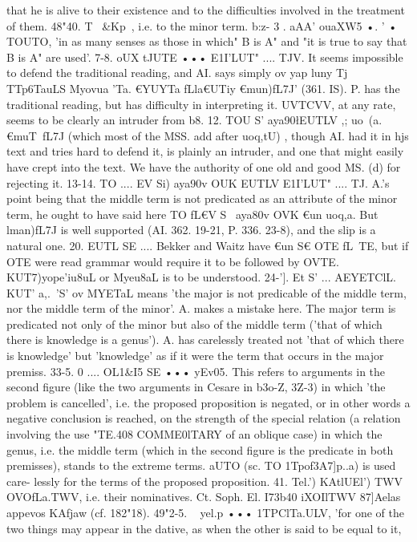{{{{{{{{{{{{{{{{{{{{{{{{{{that he is alive to their existence and to the difficulties involved
in the treatment of them.
48"40. T~ &Kp~, i.e. to the minor term.
b:z- 3 . aAA' ouaXW5 •. ' • TOUTO, 'in as many senses as those in
which" B is A" and "it is true to say that B is A" are used'.
7-8. oUX tJUTE ••• E1I'LUT" .... TJV. It seems impossible to defend
the traditional reading, and AI. says simply ov yap luny Tj
TTp6TauLS Myovua 'Ta. €YUYT{a fLla€UTiy €mun)fL7J' (361. IS). P. has
the traditional reading, but has difficulty in interpreting it.
UVTCVV, at any rate, seems to be clearly an intruder from b8.
12. TOU S' aya90\l EUTLV ,; uo~(a. €muT~fL7J (which most of the
MSS. add after uoq,tU) , though AI. had it in hjs text and tries hard
to defend it, is plainly an intruder, and one that might easily
have crept into the text. We have the authority of one old and
good MS. (d) for rejecting it.
13-14. TO .... EV Si) aya90v OUK EUTLV E1I'LUT" .... TJ. A.'s point being
that the middle term is not predicated as an attribute of the minor
term, he ought to have said here TO fL€V S~ aya80v OVK €un uoq,{a.
But lman)fL7J is well supported (AI. 362. 19-21, P. 336. 23-8), and
the slip is a natural one.
20. EUTL SE ....
Bekker and Waitz have €un S€ OTE fL~TE, but
if OTE were read grammar would require it to be followed by OVTE.
KUT7)yope'iu8uL or Myeu8aL is to be understood.
24-']. Et S' ... AEYETClL. KUT' a,\).~'\wv S' ov MYETaL means 'the
major is not predicable of the middle term, nor the middle term
of the minor'. A. makes a mistake here. The major term is
predicated not only of the minor but also of the middle term
('that of which there is knowledge is a genus'). A. has carelessly
treated not 'that of which there is knowledge' but 'knowledge' as
if it were the term that occurs in the major premiss.
33-5. 0 .... OL1&I5 SE ••• yEv05. This refers to arguments in the
second figure (like the two arguments in Cesare in b3o-Z, 3Z-3)
in which 'the problem is cancelled', i.e. the proposed proposition
is negated, or in other words a negative conclusion is reached, on
the strength of the special relation (a relation involving the use
"TE.408
COMME0lTARY
of an oblique case) in which the genus, i.e. the middle term
(which in the second figure is the predicate in both premisses),
stands to the extreme terms. aUTO (sc. TO 1Tpof3A7]p..a) is used care-
lessly for the terms of the proposed proposition.
41. Tel.') KAtlUEl') TWV OVOfLa.TWV, i.e. their nominatives. Ct.
Soph. El. I73b40 iXOIlTWV 87]Aelas ~ appevos KAfjaw (cf. 182"18).
49"2-5. ~ yel.p ••• 1TPClTa.ULV, 'for one of the two things may
appear in the dative, as when the other is said to be equal to it,
}}}}}}}}}}}}}}}}}}}}}}}}}}}}
